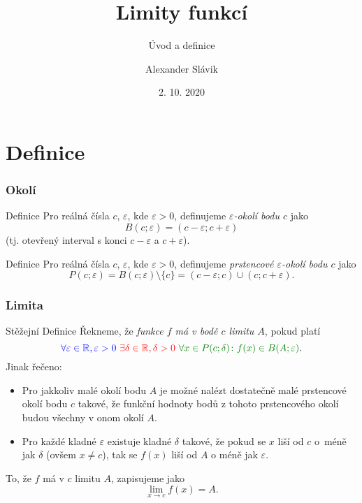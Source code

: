 \documentclass[handout]%
{beamer}
\title{Limity funkcí}
\author{Alexander Slávik} %
\subtitle{Úvod a definice}
\institute{Gymnázium Voděradská}
\date{2. 10. 2020}
\newcommand{\R}{\mathbb R}
\begin{document}
%

\section{Definice}


\begin{frame}
	\frametitle{Okolí}
	
	\begin{block}{Definice}
	Pro reálná čísla $c$, $\varepsilon$, kde $\varepsilon > 0$, definujeme \emph{$\varepsilon$-okolí bodu $c$} jako
	\[ B(c; \varepsilon) = (c-\varepsilon; c+\varepsilon) \]
	(tj. otevřený interval s konci $c-\varepsilon$ a $c + \varepsilon$).
	\end{block}
	
	\pause\bigskip
	\begin{block}{Definice}
	Pro reálná čísla $c$, $\varepsilon$, kde $\varepsilon > 0$, definujeme \emph{prstencové $\varepsilon$-okolí bodu $c$} jako
	\[ P(c; \varepsilon) = B(c; \varepsilon) \setminus \{c\} =  (c-\varepsilon; c) \cup (c; c+\varepsilon). \]
	\end{block}
\end{frame}



\begin{frame}
	\frametitle{Limita}
	
	\begin{alertblock}{Stěžejní Definice}
	Řekneme, že \emph{funkce $f$ má v bodě $c$ limitu $A$}, pokud platí
	\[ \textcolor{blue}{\forall \varepsilon \in \R, \varepsilon>0} \  \textcolor{red}{\exists \delta \in \R, \delta > 0}\  \textcolor{green!50!black}{\forall x \in P(c; \delta)\colon f(x) \in B(A; \varepsilon)}.  \]
	\pause
	Jinak řečeno:\pause
	\begin{itemize}
		\item Pro jakkoliv malé okolí bodu $A$ je možné nalézt dostatečně malé prstencové okolí bodu $c$ takové, že funkční hodnoty bodů z tohoto prstencového okolí budou všechny v onom okolí $A$.\pause
		\item Pro každé kladné $\varepsilon$ existuje kladné $\delta$ takové, že pokud se $x$ liší od $c$ o~méně jak $\delta$ (ovšem $x \neq c$), tak se $f(x)$ liší od $A$ o méně jak $\varepsilon$.
	\end{itemize}
	
	\end{alertblock}
	\pause
	To, že $f$ má v $c$ limitu $A$, zapisujeme jako
	\[ \lim_{x \to c} f(x) = A. \]
	
\end{frame}
\end{document}
